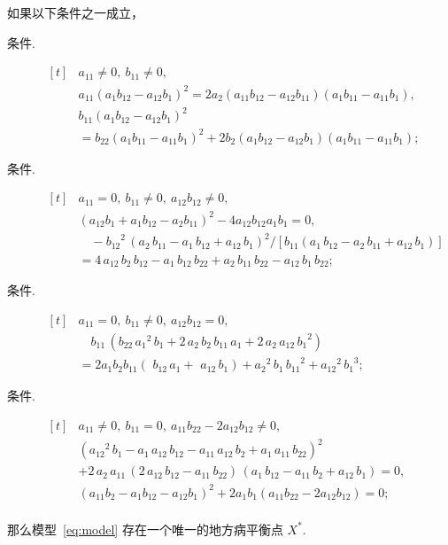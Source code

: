 \begin{theorem}[地方病平衡点的存在性和唯一性]
	\label{thm:eep}
	如果以下条件之一成立，
	\begin{description}
		\item[条件.]
		$\begin{aligned}[t]
			 & a_{11} \neq 0,\ b_{11} \neq 0,
			 \\
			 & a_{11} \left( a_1 b_{12} - a_{12} b_1 \right) ^2 = 2 a_2 \left( a_{11} b_{12} - a_{12} b_{11} \right) \left(a_1 b_{11}-a_{11} b_1\right),
			 \\
			 & b_{11} \left(a_1 b_{12}-a_{12} b_1\right)^2 \\
			 & = b_{22} \left( a_1 b_{11}-a_{11} b_1 \right) ^2 +2 b_2 \left(a_1 b_{12}-a_{12} b_1\right) \left(a_1 b_{11}-a_{11} b_1\right);
		\end{aligned}$
		\item[条件.]
		$\begin{aligned}[t]
			 & a_{11} = 0,\ b_{11} \neq 0,\ a_{12} b_{12} \neq 0,
			 \\
			 & \left( a_{12} b_1+a_1 b_{12} - a_2 b_{11} \right)^2-4 a_{12} b_{12} a_1 b_1 =0,
			 \\
			 & \quad - {b_{12} }^2 \,{{\left(a_2 \,b_{11} -a_1 \,b_{12} +a_{12} \,b_1 \right)}}^2 / \left[ b_{11} {\left(a_1 \,b_{12} -a_2 \,b_{11} +a_{12} \,b_1 \right)}\right]
			 \\
			 & = 4\,a_{12} \,b_2 \,b_{12} -a_1 \,b_{12} \,b_{22} +a_2 \,b_{11} \,b_{22} -a_{12} \,b_1 \,b_{22};
		\end{aligned}$
		\item[条件.]
		$\begin{aligned}[t]
			 & a_{11} = 0, \ b_{11} \neq 0,\ a_{12} b_{12} = 0,
			 \\
			 & \quad b_{11} \,{\left(b_{22} \,{a_1 }^2 \,b_1 +2\,a_2 \,b_2 \,b_{11} \,a_1 +2\,a_2 \,a_{12} \,{b_1 }^2 \right)}
			 \\
			 & = 2 a_1 b_2 b_{11}(\, \,b_{12} \,a_1 + \, \,a_{12} \,b_1 ) +{a_2 }^2 \,b_1 \,{b_{11} }^2 +{a_{12} }^2 \,{b_1 }^3;
		\end{aligned}$
		\item[条件.]
		$\begin{aligned}[t]
			 & a_{11} \neq 0,\ b_{11} = 0,\ a_{11} b_{22}-2a_{12} b_{12} \neq 0,
			 \\
			 & {{\left({a_{12} }^2 \,b_1 -a_1 \,a_{12} \,b_{12} -a_{11} \,a_{12} \,b_2 +a_1 \,a_{11} \,b_{22} \right)}}^2
			 \\
			 & +2\,a_2 \,a_{11} \,{\left(2\,a_{12} \,b_{12} -a_{11} \,b_{22} \right)}\,{\left(a_1 \,b_{12} -a_{11} \,b_2 +a_{12} \,b_1 \right)}=0,
			 \\
			 & (a_{11} b_2-a_1 b_{12}-a_{12} b_1 )^2 +2 a_1 b_1 (a_{11} b_{22}-2a_{12} b_{12}) =0;
			 \\
		\end{aligned}$
	\end{description}
	那么模型~\eqref{eq:model} 存在一个唯一的地方病平衡点 $ X^* $.
\end{theorem}

